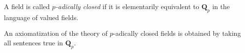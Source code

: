 A field is called \emph{$p$-adically closed} if it is elementarily equivalent to $\mathbf{Q}_p$ in the language of valued fields.

An axiomatization of the theory of $p$-adically closed fields is obtained by taking all sentences true in $\mathbf{Q}_p$.
